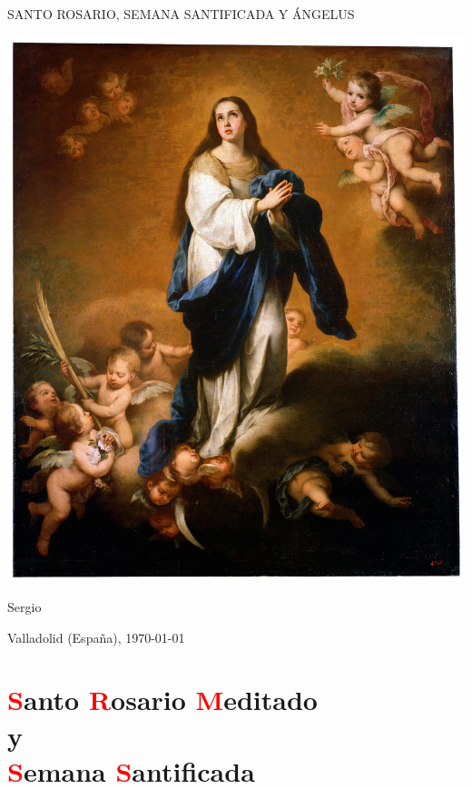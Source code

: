 \documentclass[10pt,twoside]{book}
\begin{document}
\begin{titlepage}
      \begin{center}

            \vspace*{10em}

            {\Huge \uppercase{Santo Rosario, Semana Santificada y Ángelus}}

            \vspace{1.5em}

            {\includegraphics[scale=0.95]{foto-04.jpg}}

            \vspace{0.5em}

            Sergio

            Valladolid (España), \monthyeardate\today
      \end{center}
\end{titlepage}

\chapter*{\centering\textcolor{red}{S}anto \textcolor{red}{R}osario \textcolor{red}{M}editado \\ y \\ \textcolor{red}{S}emana \textcolor{red}{S}antificada}
\end{document}
